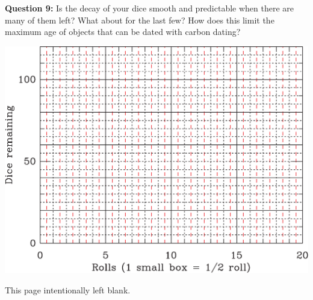 \documentclass[11pt]{article}
\begin{document}
\vspace{1.5in}

{\bf Question 9:} Is the decay of your dice smooth and predictable when there are many of them left? What about for the last few? How does this limit the maximum age of objects that can be dated with carbon dating?

\newpage

\includegraphics[height=\textwidth,angle=90,origin=c]{graphpaper-crop.pdf}
\newpage
\begin{center}
This page intentionally left blank.
\end{center}
\newpage
\huge
\end{document}
